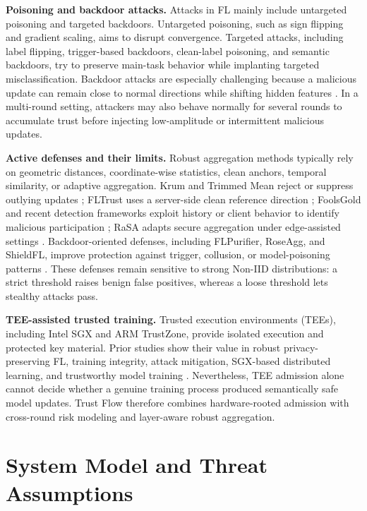 \documentclass[runningheads,orivec]{llncs}
\begin{document}
\textbf{Poisoning and backdoor attacks.} Attacks in FL mainly include untargeted poisoning and targeted backdoors. Untargeted poisoning, such as sign flipping and gradient scaling, aims to disrupt convergence. Targeted attacks, including label flipping, trigger-based backdoors, clean-label poisoning, and semantic backdoors, try to preserve main-task behavior while implanting targeted misclassification. Backdoor attacks are especially challenging because a malicious update can remain close to normal directions while shifting hidden features \cite{bagdasaryan2020backdoor,wang2019neuralcleanse}. In a multi-round setting, attackers may also behave normally for several rounds to accumulate trust before injecting low-amplitude or intermittent malicious updates.

\textbf{Active defenses and their limits.} Robust aggregation methods typically rely on geometric distances, coordinate-wise statistics, clean anchors, temporal similarity, or adaptive aggregation. Krum and Trimmed Mean reject or suppress outlying updates \cite{blanchard2017krum,yin2018byzantine}; FLTrust uses a server-side clean reference direction \cite{cao2021fltrust}; FoolsGold and recent detection frameworks exploit history or client behavior to identify malicious participation \cite{fung2020foolsgold,dou2025toward}; RaSA adapts secure aggregation under edge-assisted settings \cite{wang2025rasa}. Backdoor-oriented defenses, including FLPurifier, RoseAgg, and ShieldFL, improve protection against trigger, collusion, or model-poisoning patterns \cite{flpurifier,roseagg,shieldfl}. These defenses remain sensitive to strong Non-IID distributions: a strict threshold raises benign false positives, whereas a loose threshold lets stealthy attacks pass.

\textbf{TEE-assisted trusted training.} Trusted execution environments (TEEs), including Intel SGX and ARM TrustZone, provide isolated execution and protected key material. Prior studies show their value in robust privacy-preserving FL, training integrity, attack mitigation, SGX-based distributed learning, and trustworthy model training \cite{zhang2025rppfl,r1_tee_integrity,r5_tee_mitigating,xu2021distributed,lu2025tmt}. Nevertheless, TEE admission alone cannot decide whether a genuine training process produced semantically safe model updates. Trust Flow therefore combines hardware-rooted admission with cross-round risk modeling and layer-aware robust aggregation.

\section{System Model and Threat Assumptions}
\end{document}
